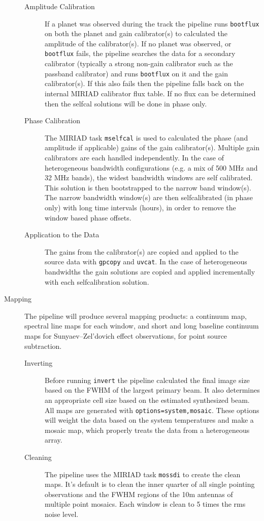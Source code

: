\begin{description}
\begin{description}
\item[Amplitude Calibration] If a planet was observed during the track the pipeline runs \verb#bootflux# on both the planet and gain calibrator(s) to calculated the amplitude of the calibrator(s). If no planet was observed, or \verb#bootflux# fails, the pipeline searches the data for a secondary calibrator (typically a strong non-gain calibrator such as the passband calibrator) and runs \verb#bootflux# on it and the gain calibrator(s). If this also fails then the pipeline falls back on the internal MIRIAD calibrator flux table. If no flux can be determined then the selfcal solutions will be done in phase only.
\item[Phase Calibration] The MIRIAD task \verb#mselfcal# is used to calculated the phase (and amplitude if applicable) gains of the gain calibrator(s). Multiple gain calibrators are each handled independently. In the case of heterogeneous bandwidth configurations (e.g. a mix of 500 MHz and 32 MHz bands), the widest bandwidth windows are self calibrated. This solution is then bootstrapped to the narrow band window(s). The narrow bandwidth window(s) are then selfcalibrated (in phase only) with long time intervals (hours), in order to remove the window based phase offsets.
\item[Application to the Data] The gains from the calibrator(s) are copied and applied to the source data with \verb#gpcopy# and \verb#uvcat#. In the case of heterogeneous bandwidths the gain solutions are copied and applied incrementally with each selfcalibration solution. 
\end{description}
\item[Mapping] The pipeline will produce several mapping products: a continuum map, spectral line maps for each window, and short and long baseline continuum maps for Sunyaev–Zel'dovich effect observations, for point source subtraction.
\begin{description}
\item[Inverting] Before running \verb#invert# the pipeline calculated the final image size based on the FWHM of the largest primary beam. It also determines an appropriate cell size based on the estimated synthesized beam. All maps are generated with \verb#options=system,mosaic#. These options will weight the data based on the system temperatures and make a mosaic map, which properly treats the data from a heterogeneous array.
\item[Cleaning] The pipeline uses the MIRIAD task \verb#mossdi# to create the clean maps. It's default is to clean the inner quarter of all single pointing observations and the FWHM regions of the 10m antennas of multiple point mosaics. Each window is clean to 5 times the rms noise level.
\end{description}
\end{description}


